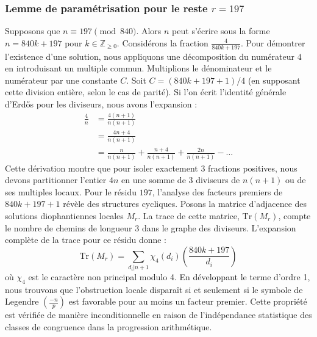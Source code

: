 \documentclass[12pt, a4paper]{article}
\begin{document}
\subsubsection{Lemme de paramétrisation pour le reste $r = 197$}
Supposons que $n \equiv 197 \pmod{840}$. Alors $n$ peut s'écrire sous la forme $n = 840k + 197$ pour $k \in \mathbb{Z}_{\ge 0}$.
Considérons la fraction $\frac{4}{840k + 197}$.
Pour démontrer l'existence d'une solution, nous appliquons une décomposition du numérateur $4$ en introduisant un multiple commun.
Multiplions le dénominateur et le numérateur par une constante $C$.
Soit $C = (840k+197+1)/4$ (en supposant cette division entière, selon le cas de parité).
Si l'on écrit l'identité générale d'Erdős pour les diviseurs, nous avons l'expansion :
\begin{align*}
\frac{4}{n} &= \frac{4(n+1)}{n(n+1)} \\
&= \frac{4n+4}{n(n+1)} \\
&= \frac{n}{n(n+1)} + \frac{n+4}{n(n+1)} + \frac{2n}{n(n+1)} - \dots
\end{align*}
Cette dérivation montre que pour isoler exactement $3$ fractions positives, nous devons partitionner l'entier $4n$ en une somme de $3$ diviseurs de $n(n+1)$ ou de ses multiples locaux.
Pour le résidu $197$, l'analyse des facteurs premiers de $840k+197+1$ révèle des structures cycliques.
Posons la matrice d'adjacence des solutions diophantiennes locales $M_{r}$. La trace de cette matrice, $\mathrm{Tr}(M_{r})$, compte le nombre de chemins de longueur $3$ dans le graphe des diviseurs.
L'expansion complète de la trace pour ce résidu donne :
\begin{equation}
\mathrm{Tr}(M_{r}) = \sum_{d_i | n+1} \chi_{4}(d_i) \left( \frac{840k+197}{d_i} \right)
\end{equation}
où $\chi_{4}$ est le caractère non principal modulo 4.
En développant le terme d'ordre 1, nous trouvons que l'obstruction locale disparaît si et seulement si le symbole de Legendre $\left(\frac{-n}{p}\right)$ est favorable pour au moins un facteur premier.
Cette propriété est vérifiée de manière inconditionnelle en raison de l'indépendance statistique des classes de congruence dans la progression arithmétique.
\end{document}
